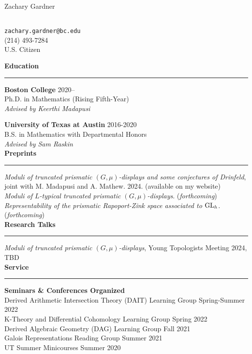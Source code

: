\documentclass[11pt]{article}
\newenvironment{mysection}{
\color{mygreen}\bfseries\large
}
{
\\ \rule{\textwidth}{1pt}\hspace{-.25em}
} %
\begin{document}
\begin{center}
\begin{LARGE}Zachary Gardner\end{LARGE} \\
\vspace{1em}
\texttt{zachary.gardner@bc.edu} \\
(214) 493-7284 \\
U.S. Citizen \\
\end{center}

\begin{mysection}Education\end{mysection}
\textbf{Boston College} \hfill 2020-- \\
Ph.D. in Mathematics (Rising Fifth-Year) \\
\textit{Advised by Keerthi Madapusi}

\textbf{University of Texas at Austin} \hfill 2016-2020 \\
B.S. in Mathematics with Departmental Honors \\
\textit{Advised by Sam Raskin} \\

\begin{mysection}Preprints\end{mysection}
\!\!\textit{Moduli of truncated prismatic $(G,\mu)$-displays and some conjectures of Drinfeld}, joint with M. Madapusi and A. Mathew. 2024. (available on my website) \\
\textit{Moduli of $L$-typical truncated prismatic $(G,\mu)$-displays}. (\textit{forthcoming}) \\
\textit{Representability of the prismatic Rapoport-Zink space associated to $\textup{GL}_h$}. (\textit{forthcoming}) \\

\begin{mysection}Research Talks\end{mysection}
\textit{Moduli of truncated prismatic $(G,\mu)$-displays}, Young Topologists Meeting 2024, TBD \\

\begin{mysection}Service \end{mysection}
\textbf{Seminars \& Conferences Organized} \\
Derived Arithmetic Intersection Theory (DAIT) Learning Group \hfill Spring-Summer 2022 \\
K-Theory and Differential Cohomology Learning Group \hfill Spring 2022 \\
Derived Algebraic Geometry (DAG) Learning Group \hfill Fall 2021 \\
Galois Representations Reading Group \hfill Summer 2021 \\
UT Summer Minicourses \hfill Summer 2020
\end{document}
